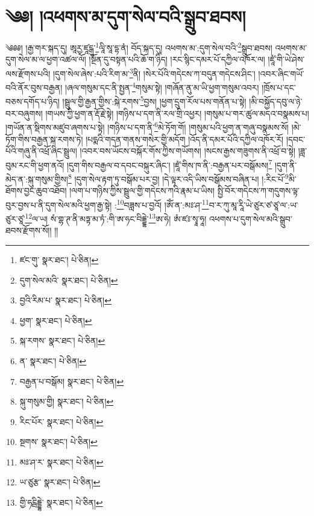 \setcounter{footnote}{0} 
\chapter{༄༅། །འཕགས་མ་དུག་སེལ་བའི་སྒྲུབ་ཐབས།}༄༅༅། །རྒྱ་གར་སྐད་དུ། ཨཱརྱ་ཛཱངྒུ་\footnote{ཛང་གུ་  སྣར་ཐང་།  པེ་ཅིན། }ལཱི་སཱ་དྷ་ནཾ། བོད་སྐད་དུ། འཕགས་མ་:དུག་སེལ་བའི་\footnote{དུག་སེལ་མའི་  སྣར་ཐང་།  པེ་ཅིན། }སྒྲུབ་ཐབས། འཕགས་མ་དུག་སེལ་མ་ལ་ཕྱག་འཚལ་ལོ། །སྔོན་དུ་བསྟན་པའི་ཆོ་ག་ཉིད། །རང་སྙིང་དམར་པོ་དཀྱིལ་འཁོར་ལ། །ཛཱཾ་གི་ཡེ་ཤེས་ལས་རྫོགས་པའི། །དུག་སེལ་ཞེས་:པའི་རིག་མ་\footnote{བྱའི་རིམ་པ་  སྣར་ཐང་།  པེ་ཅིན། }ནི། །སེར་པོའི་གདེངས་ཀ་བདུན་གདེངས་ཤིང་། །འབར་ཞིང་གཡོ་བའི་ནོར་བུས་བརྒྱན། །ཞལ་གསུམ་དང་ནི་སྤྱན་\footnote{ཕྱག་  སྣར་ཐང་།  པེ་ཅིན། }གསུམ་སྟེ། །གཞོན་ནུ་མ་ཡི་ཕྱག་གསུམ་འབར། །ཁྲོས་པ་དང་བཅས་དགོད་པ་ཉིད། །སྦྲུལ་གྱི་རྒྱན་གྱིས་:སྐེ་རགས་\footnote{སྐ་རགས་  སྣར་ཐང་།  པེ་ཅིན། }བྱས། །ཕྱག་དྲུག་རོལ་པས་གནོན་པ་སྟེ། །མི་བསྐྱོད་དབུ་ལ་ཉེ་བར་བཞུགས། །གཡས་ཀྱི་ཕྱག་ན་རྡོ་རྗེ་སྟེ། །གཉིས་པ་དག་ནི་རལ་གྲི་འཕྱར། །གསུམ་པ་གར་ཚུལ་མདའ་བསྣམས་པ། །གཡོན་ན་སྡིགས་མཛུབ་ཞགས་པ་སྟེ། །གཉིས་པ་དག་ནི་\footnote{ན་  སྣར་ཐང་།  པེ་ཅིན། }མེ་ཏོག་གོ། །གསུམ་པའི་ཕྱག་ན་གཞུ་བསྣམས་སོ། །མེ་ཏོག་གིས་བརྒྱན་སྐ་རགས་ཏེ། །པདྨའི་གདན་གནས་གསེར་གྱི་མདོག །འོད་ནི་དམར་པོའི་དཀྱིལ་འཁོར་རོ། །དབང་པོའི་གཞུ་ནི་འཕྲོ་ཞིང་སྦྲུལ། །འབར་བས་ཡོངས་བསྐོར་གོས་ཀྱིས་གཡོགས། །སངས་རྒྱས་གཟུགས་ནི་འཕྲོ་བ་སྟེ། །ཟླ་བུམ་རང་གི་ཕྱག་ནའོ། །དུག་གིས་བརྒྱལ་བ་དབང་བསྐུར་ཞིང་། །ཛཱཾ་གིས་ཁ་ནི་:བརྒྱན་པར་བསྒོམས།\footnote{བརྒྱན་པ་བསྒོམ།  སྣར་ཐང་།  པེ་ཅིན། } །དུག་ནི་མེད་ན་:སྐུ་གསུམ་གྱིས།\footnote{སྐུ་གསུམ་གྱི།  སྣར་ཐང་།  པེ་ཅིན། } །དུག་སེལ་རྟག་ཏུ་བསྒོམ་པར་བྱ། །དེ་ལྟར་འདི་ཡིས་བསྒོམས་བཞིན་པ། །:རིང་པོ་\footnote{རིང་པོར་  སྣར་ཐང་།  པེ་ཅིན། }མི་ཐོགས་བྱང་ཆུབ་འཐོབ། །ལག་པ་གཉིས་ཀྱིས་སྦྲུལ་གྱི་གདེངས་ཀའི་རྣམ་པ་ཡིས། སྤྱི་བོར་གདེངས་ཀ་གདུགས་ལྟ་བུར་བྱས་པ་ནི་དུག་སེལ་མའི་ཕྱག་རྒྱ་སྟེ། :\footnote{སྔགས་  སྣར་ཐང་།  པེ་ཅིན། }བཟླས་པ་བྱའོ། །ཨོཾ་ན་:མཿ་ཤ་\footnote{མཿ་ཤ་ར་  སྣར་ཐང་།  པེ་ཅིན། }བ་ར་ཀུ་མཱ་རཱི་ཡེ་ཙུར་ཙ་ཙཱ་ལ་:ཡ་ཙུར་ཙཱ་\footnote{ཡ་ཙུརྩ་  སྣར་ཐང་།  པེ་ཅིན། }ལ་ཡ། སཾ་གྷ་ཊ་ནི་མཏྟ་མ་ཏཾ་:གི་ཨ་ཧང་བིདྡྷེ་\footnote{གྱི་ཧངྦིདྡྷེ་  སྣར་ཐང་།  པེ་ཅིན། }ཨ་ཧེ། ཨཾ་ཛཿ་སྭཱ་ཧཱ། འཕགས་པ་དུག་སེལ་མའི་སྒྲུབ་ཐབས་རྫོགས་སོ།། །།